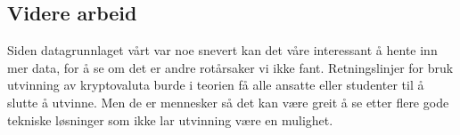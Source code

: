 \subsection{Videre arbeid}
Siden datagrunnlaget vårt var noe snevert kan det våre interessant å hente inn mer data, for å se om det er andre rotårsaker vi ikke fant. Retningslinjer for bruk utvinning av kryptovaluta burde i teorien få alle ansatte eller studenter til å slutte å utvinne. Men de er mennesker så det kan være greit å se etter flere gode tekniske løsninger som ikke lar utvinning være en mulighet.






